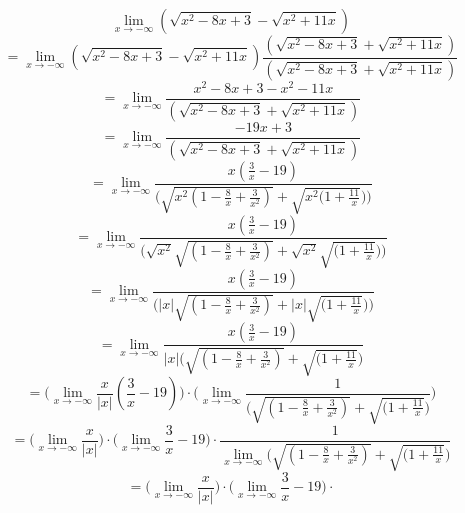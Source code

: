 \documentclass{article}
\begin{document}
\begin{equation*}
    \lim_{x \to -\infty} (\sqrt{x^2 -8x + 3} - \sqrt{x^2 +11x}) 
\end{equation*}
\begin{equation*}
    = \lim_{x \to -\infty} (\sqrt{x^2 -8x + 3} - \sqrt{x^2 +11x}) \frac{(\sqrt{x^2 -8x + 3} + \sqrt{x^2 +11x})}{(\sqrt{x^2 -8x + 3} + \sqrt{x^2 +11x})} 
\end{equation*}
\begin{equation*}
    = \lim_{x \to -\infty} \frac{x^2 -8x + 3 -x^2 - 11x}{(\sqrt{x^2 -8x + 3} + \sqrt{x^2 +11x})}
\end{equation*}
\begin{equation*}
    = \lim_{x \to -\infty} \frac{-19x + 3}{(\sqrt{x^2 -8x + 3} + \sqrt{x^2 +11x})}
\end{equation*}
\begin{equation*}
    = \lim_{x \to -\infty} \frac{x(\frac{3}{x} - 19)}{\Big(\sqrt{x^2(1 - \frac{8}{x} + \frac{3}{x^2})} + \sqrt{x^2(1 + \frac{11}{x}})\Big)}
\end{equation*}
\begin{equation*}
    = \lim_{x \to -\infty} \frac{x(\frac{3}{x} - 19)}{\Big(\sqrt{x^2}\sqrt{(1 - \frac{8}{x} + \frac{3}{x^2})} + \sqrt{x^2}\sqrt{(1 + \frac{11}{x}})\Big)}
\end{equation*}
\begin{equation*}
    = \lim_{x \to -\infty} \frac{x(\frac{3}{x} - 19)}{\Big(|x|\sqrt{(1 - \frac{8}{x} + \frac{3}{x^2})} + |x|\sqrt{(1 + \frac{11}{x}})\Big)}
\end{equation*}
\begin{equation*}
    = \lim_{x \to -\infty} \frac{x(\frac{3}{x} - 19)}{|x| \Big(\sqrt{(1 - \frac{8}{x} + \frac{3}{x^2})} + \sqrt{(1 + \frac{11}{x}}\Big)}
\end{equation*}
\begin{equation*}
    = \Bigg(\lim_{x \to -\infty} \frac{x}{|x|}(\frac{3}{x} - 19)\Bigg) \cdot \Bigg(\lim_{x \to -\infty} \frac{1}{\Big(\sqrt{(1 - \frac{8}{x} + \frac{3}{x^2})} + \sqrt{(1 + \frac{11}{x}}\Big)}\Bigg)
\end{equation*}
\begin{equation*}
    = \Bigg(\lim_{x \to -\infty} \frac{x}{|x|}\Bigg) \cdot \Bigg(\lim_{x \to -\infty} \frac{3}{x} - 19 \Bigg) \cdot \frac{1}{\lim_{x \to -\infty} \Big(\sqrt{(1 - \frac{8}{x} + \frac{3}{x^2})} + \sqrt{(1 + \frac{11}{x}}\Big)}
\end{equation*}
\begin{equation*}
   = \Bigg(\lim_{x \to -\infty} \frac{x}{|x|}\Bigg) \cdot \Bigg(\lim_{x \to -\infty} \frac{3}{x} - 19 \Bigg) \cdot
\end{equation*}
\end{document}
